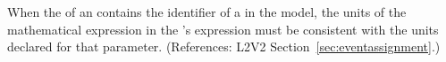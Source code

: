 When the   of an \EventAssignment
contains the identifier of a \Parameter in the model, the
units of the mathematical expression in the
\EventAssignment's  expression must be
consistent with the units declared for that parameter.
(References: L2V2 Section~\ref{sec:eventassignment}.)
